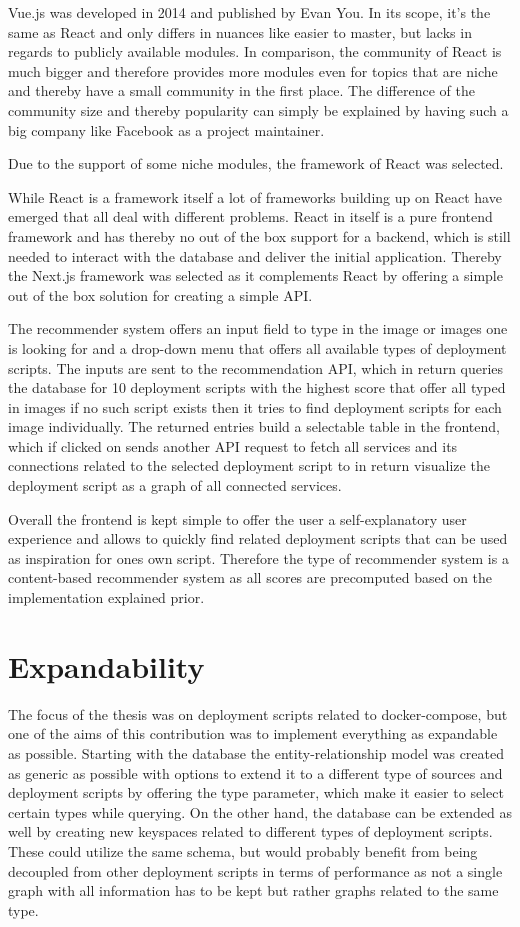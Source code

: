 Vue.js was developed in 2014 and published by Evan You. In its scope, it's the same as React and only differs in nuances like easier to master, but lacks in regards to publicly available modules. In comparison, the community of React is much bigger and therefore provides more modules even for topics that are niche and thereby have a small community in the first place. The difference of the community size and thereby popularity can simply be explained by having such a big company like Facebook as a project maintainer.

Due to the support of some niche modules, the framework of React was selected.

While React is a framework itself a lot of frameworks building up on React have emerged that all deal with different problems. React in itself is a pure frontend framework and has thereby no out of the box support for a backend, which is still needed to interact with the database and deliver the initial application. Thereby the Next.js framework was selected as it complements React by offering a simple out of the box solution for creating a simple API.

The recommender system offers an input field to type in the image or images one is looking for and a drop-down menu that offers all available types of deployment scripts. The inputs are sent to the recommendation API, which in return queries the database for 10 deployment scripts with the highest score that offer all typed in images if no such script exists then it tries to find deployment scripts for each image individually. The returned entries build a selectable table in the frontend, which if clicked on sends another API request to fetch all services and its connections related to the selected deployment script to in return visualize the deployment script as a graph of all connected services.

Overall the frontend is kept simple to offer the user a self-explanatory user experience and allows to quickly find related deployment scripts that can be used as inspiration for ones own script. Therefore the type of recommender system is a content-based recommender system as all scores are precomputed based on the implementation explained prior.
\section{Expandability}
The focus of the thesis was on deployment scripts related to docker-compose, but one of the aims of this contribution was to implement everything as expandable as possible.
Starting with the database the entity-relationship model was created as generic as possible with options to extend it to a different type of sources and deployment scripts by offering the type parameter, which make it easier to select certain types while querying. On the other hand, the database can be extended as well by creating new keyspaces related to different types of deployment scripts. These could utilize the same schema, but would probably benefit from being decoupled from other deployment scripts in terms of performance as not a single graph with all information has to be kept but rather graphs related to the same type.

